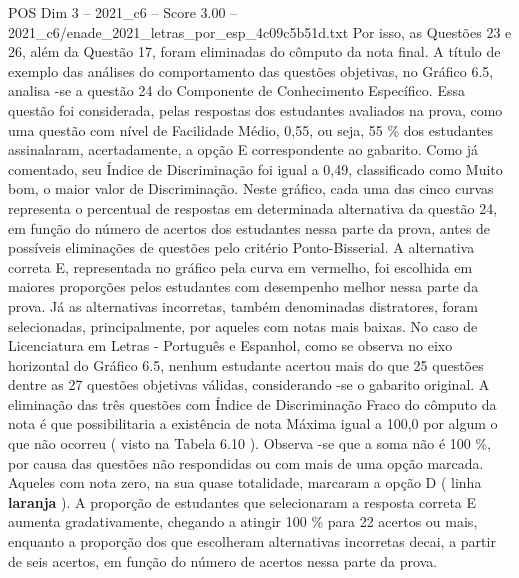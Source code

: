 \begin{textsample}{POS Dim 3 – 2021\_c6 – Score 3.00 – 2021\_c6/enade\_2021\_letras\_por\_esp\_4c09c5b51d.txt}
Por isso, as Questões 23 e 26, além da Questão 17, foram eliminadas do cômputo da nota final.
A título de exemplo das análises do comportamento das questões objetivas, no Gráfico 6.5, analisa -se a questão 24 do Componente de Conhecimento Específico.
Essa questão foi considerada, pelas respostas dos estudantes avaliados na prova, como uma questão com nível de Facilidade Médio, 0,55, ou seja, 55 \% dos estudantes assinalaram, acertadamente, a opção E correspondente ao gabarito.
Como já comentado, seu Índice de Discriminação foi igual a 0,49, classificado como Muito bom, o maior valor de Discriminação.
Neste gráfico, cada uma das cinco curvas representa o percentual de respostas em determinada alternativa da questão 24, em função do número de acertos dos estudantes nessa parte da prova, antes de possíveis eliminações de questões pelo critério Ponto-Bisserial.
A alternativa correta E, representada no gráfico pela curva em vermelho, foi escolhida em maiores proporções pelos estudantes com desempenho melhor nessa parte da prova.
Já as alternativas incorretas, também denominadas distratores, foram selecionadas, principalmente, por aqueles com notas mais baixas.
No caso de Licenciatura em Letras - Português e Espanhol, como se observa no eixo horizontal do Gráfico 6.5, nenhum estudante acertou mais do que 25 questões dentre as 27 questões objetivas válidas, considerando -se o gabarito original.
A eliminação das três questões com Índice de Discriminação Fraco do cômputo da nota é que possibilitaria a existência de nota Máxima igual a 100,0 por algum o que não ocorreu ( visto na Tabela 6.10 ).
Observa -se que a soma não é 100 \%, por causa das questões não respondidas ou com mais de uma opção marcada.
Aqueles com nota zero, na sua quase totalidade, marcaram a opção D ( linha \textbf{laranja} ).
A proporção de estudantes que selecionaram a resposta correta E aumenta gradativamente, chegando a atingir 100 \% para 22 acertos ou mais, enquanto a proporção dos que escolheram alternativas incorretas decai, a partir de seis acertos, em função do número de acertos nessa parte da prova.

\end{textsample}
